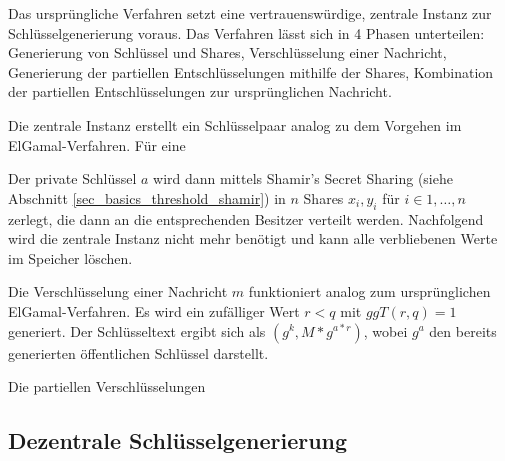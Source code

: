 Das ursprüngliche Verfahren setzt eine vertrauenswürdige, zentrale Instanz zur Schlüsselgenerierung voraus. Das Verfahren lässt sich in 4 Phasen unterteilen: Generierung von Schlüssel und Shares, Verschlüsselung einer Nachricht, Generierung der partiellen Entschlüsselungen mithilfe der Shares, Kombination der partiellen Entschlüsselungen zur ursprünglichen Nachricht. 


Die zentrale Instanz erstellt ein Schlüsselpaar analog zu dem Vorgehen im ElGamal-Verfahren. Für eine 

Der private Schlüssel \(a\) wird dann mittels Shamir's Secret Sharing (siehe Abschnitt \ref{sec_basics_threshold_shamir}) in \(n\) Shares \(x_i, y_i\) für \(i \in {1, \dots, n}\) zerlegt, die dann an die entsprechenden Besitzer verteilt werden. Nachfolgend wird die zentrale Instanz nicht mehr benötigt und kann alle verbliebenen Werte im Speicher löschen.


Die Verschlüsselung einer Nachricht \(m\) funktioniert analog zum ursprünglichen ElGamal-Verfahren. Es wird ein zufälliger Wert \(r < q\) mit \(ggT(r,q) = 1\) generiert. Der Schlüsseltext ergibt sich als \((g^k, M * g^{a*r})\), wobei \(g^a\) den bereits generierten öffentlichen Schlüssel darstellt.


Die partiellen Verschlüsselungen 

\subsection{Dezentrale Schlüsselgenerierung}